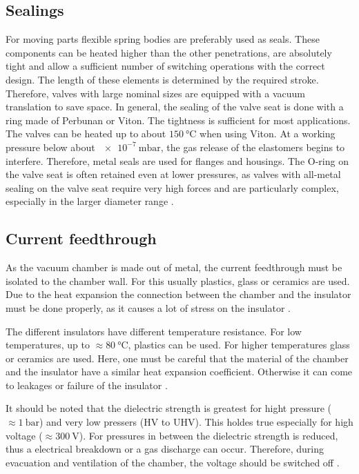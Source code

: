 \subsection{Sealings}
For moving parts flexible spring bodies are preferably used as seals.
These components can be heated higher than the other penetrations, are absolutely tight and allow a sufficient number of switching operations with the correct design.
The length of these elements is determined by the required stroke. Therefore, valves with large nominal sizes are equipped with a vacuum translation to save space.
In general, the sealing of the valve seat is done with a ring made of Perbunan or Viton.
The tightness is sufficient for most applications.
The valves can be heated up to about $\SI{150}{\degreeCelsius}$ when using Viton.
At a working pressure below about $\SI{e-7}{\milli\bar}$, the gas release of the elastomers begins to interfere.
Therefore, metal seals are used for flanges and housings.
The O-ring on the valve seat is often retained even at lower pressures, as valves with all-metal sealing on the valve seat require very high forces and are particularly complex, especially in the larger diameter range \cite{Wutz2000}.

\subsection{Current feedthrough}

As the vacuum chamber is made out of metal, the current feedthrough must be isolated to the chamber wall.
For this usually plastics, glass or ceramics are used.
Due to the heat expansion the connection between the chamber and the insulator must be done properly, as it causes a lot of stress on the insulator \cite{Wutz2000}.

The different insulators have different temperature resistance.
For low temperatures, up to $\approx \SI{80}{\degreeCelsius}$, plastics can be used.
For higher temperatures glass or ceramics are used.
Here, one must be careful that the material of the chamber and the insulator have a similar heat expansion coefficient.
Otherwise it can come to leakages or failure of the insulator \cite{Wutz2000}.

It should be noted that the dielectric strength is greatest for hight pressure ($\approx \SI{1}{\bar}$) and very low pressers (HV to UHV).
This holdes true especially for high voltage ($\approx \SI{300}{\volt}$).
For pressures in between the dielectric strength is reduced, thus a electrical breakdown or a gas discharge can occur.
Therefore, during evacuation and ventilation of the chamber, the voltage should be switched off \cite{Wutz2000}.


